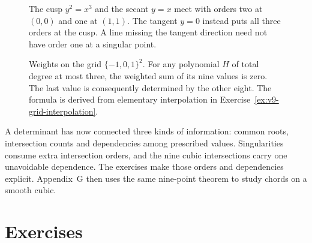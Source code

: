 \FloatBarrier
\begin{figure}[ht]
\centering
{}
\caption{The cusp $y^2=x^3$ and the secant $y=x$ meet with orders two at $(0,0)$ and one at $(1,1)$. The tangent $y=0$ instead puts all three orders at the cusp. A line missing the tangent direction need not have order one at a singular point.}
\label{fig:v9-cusp-multiplicity}
\end{figure}
\begin{figure}[ht]
\centering
{}
\caption{Weights on the grid $\{-1,0,1\}^2$. For any polynomial $H$ of total degree at most three, the weighted sum of its nine values is zero. The last value is consequently determined by the other eight. The formula is derived from elementary interpolation in Exercise~\ref{ex:v9-grid-interpolation}.}
\label{fig:v9-grid-weights}
\end{figure}

A determinant has now connected three kinds of information: common roots, intersection counts and dependencies among prescribed values. Singularities consume extra intersection orders, and the nine cubic intersections carry one unavoidable dependence. The exercises make those orders and dependencies explicit. Appendix~G then uses the same nine-point theorem to study chords on a smooth cubic.
\FloatBarrier

\section{Exercises}

